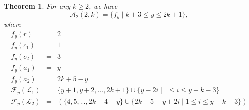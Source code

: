 \documentclass[10pt]{article}
\newtheorem{theorem}{Theorem}
\theoremstyle{definition}
\begin{document}
\begin{theorem}
  \label{thm:A_2(2,k)}
  For any $k \ge 2$, we have
  $$
  \mathcal{A}_2(2, k) = \{f_y \mid k + 3 \le y \le 2k + 1\},
  $$
  where
  $$
  \begin{array}{lcl}
    f_y(r) & = & 2 \\
    f_y(c_1) & = & 1 \\
    f_y(c_2) & = & 3 \\
    f_y(a_1) & = & y \\
    f_y(a_2) & = & 2k + 5 - y \\
    \mathcal{F}_y(\mathcal{L}_1) & = & \{y + 1, y + 2, \dots, 2k + 1\} \cup \{y - 2i \mid 1 \le i \le y - k - 3\}\\
    \mathcal{F}_y(\mathcal{L}_2) & = & \left( \{4, 5, \dots, 2k + 4 - y\} \cup \{2k + 5 - y + 2i \mid 1 \le i \le y - k - 3\} \right)\\
  \end{array}
  $$
\end{theorem}
\end{document}
